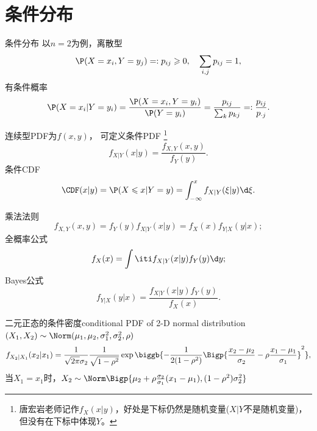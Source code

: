 \section{条件分布}

\begin{definition}
	{条件分布}{}
	以$n=2$为例，离散型
	\[
		\P(X=x_i,Y=y_j)=:p_{ij}\geqslant 0,\quad\sum_{i,j}p_{ij}=1,
	\]
	有条件概率
	\begin{equation}
		\P(X=x_i|Y=y_i)=\frac{\P(X=x_i,Y=y_i)}{\P(Y=y_i)}=\frac{p_{ij}}{\sum_kp_{kj}}=:\frac{p_{ij}}{p_{\cdot j}}.
	\end{equation}
	
	连续型PDF为$f(x,y)$，
	可定义条件PDF
	\footnote{唐宏岩老师记作$f_X(x|y)$，好处是下标仍然是随机变量($X|Y$不是随机变量)，但没有在下标中体现$Y$。}
	\begin{equation}
		f_{X|Y}(x|y)=\frac{f_{X,Y}(x,y)}{f_Y(y)}.
	\end{equation}
	条件CDF
	\[
		\CDF(x|y)=\P(X\leqslant x|Y=y)=\int_{-\infty}^x f_{X|Y}(\xi|y)\d \xi.
	\]%
\end{definition}

\begin{corollary}
	乘法法则
	\begin{equation}
		f_{X,Y}(x,y)=f_Y(y)f_{X|Y}(x|y)=f_X(x)f_{Y|X}(y|x);
	\end{equation}
	全概率公式 
	\begin{equation}
		f_X(x)=\int\iti f_{X|Y}(x|y)f_Y(y)\d y;
	\end{equation}
	Bayes公式 
	\begin{equation}
		f_{Y|X}(y|x)=\frac{f_{X|Y}(x|y)f_Y(y)}{f_X(x)}.
	\end{equation}
\end{corollary}

\begin{example}{二元正态的条件密度}{conditional PDF of 2-D normal distribution}
	$(X_1,X_2)\sim\Norm(\mu_1,\mu_2,\sigma_1^2,\sigma_2^2,\rho)$
	\begin{equation}
		f_{X_2|X_1}(x_2|x_1)=\frac1{\sqrt{2\pi}\sigma_2}\frac1{\sqrt{1-\rho^2}}\exp\biggb{-\frac1{2(1-\rho^2)}\Bigp{\frac{x_2-\mu_2}{\sigma_2}-\rho\frac{x_1-\mu_1}{\sigma_1}}^2},
	\end{equation}
	当$X_1=x_1$时，$X_2\sim\Norm\Bigp{\mu_2+\rho\frac{\sigma_2}{\sigma_1}(x_1-\mu_1),(1-\rho^2)\sigma_2^2}$
\end{example}

